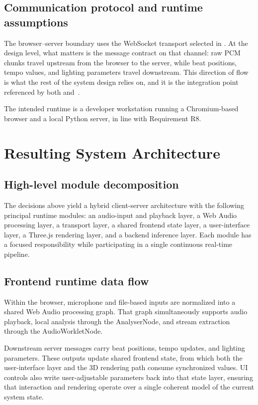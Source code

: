 \subsection{Communication protocol and runtime assumptions}
\label{sec:ch4-communication-protocol}

The browser--server boundary uses the WebSocket transport selected in . At the design level, what matters is the message contract on that channel: raw PCM chunks travel upstream from the browser to the server, while beat positions, tempo values, and lighting parameters travel downstream. This direction of flow is what the rest of the system design relies on, and it is the integration point referenced by both  and~.

The intended runtime is a developer workstation running a Chromium-based browser and a local Python server, in line with Requirement R8.

\section{Resulting System Architecture}

\subsection{High-level module decomposition}

The decisions above yield a hybrid client-server architecture with the following principal runtime modules: an audio-input and playback layer, a Web Audio processing layer, a transport layer, a shared frontend state layer, a user-interface layer, a Three.js rendering layer, and a backend inference layer. Each module has a focused responsibility while participating in a single continuous real-time pipeline.

\subsection{Frontend runtime data flow}
\label{sec:ch4-frontend-runtime-data-flow}

Within the browser, microphone and file-based inputs are normalized into a shared Web Audio processing graph. That graph simultaneously supports audio playback, local analysis through the AnalyserNode, and stream extraction through the AudioWorkletNode.

Downstream server messages carry beat positions, tempo updates, and lighting parameters. These outputs update shared frontend state, from which both the user-interface layer and the 3D rendering path consume synchronized values. UI controls also write user-adjustable parameters back into that state layer, ensuring that interaction and rendering operate over a single coherent model of the current system state.

